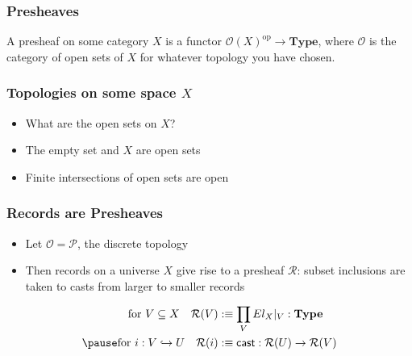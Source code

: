 \documentclass[tikz, 12pt]{beamer}
\begin{document}
\begin{frame}
  \frametitle{Presheaves}\pause

  A presheaf on some category $X$ is a functor
  $\mathcal{O}(X)^{\mathrm{op}}\to\mathbf{Type}$, where $\mathcal{O}$ is the
  category of open sets of $X$ for whatever topology you have chosen.
\end{frame}

\begin{frame}
  \frametitle{Topologies on some space $X$}\pause

  \begin{itemize}
    \item What are the open sets on $X$?\pause
    \item The empty set and $X$ are open sets
    \item Finite intersections of open sets are open
  \end{itemize}
\end{frame}

\begin{frame}
  \frametitle{Records are Presheaves}\pause

  \begin{itemize}
    \item Let $\mathcal{O} = \mathcal{P}$, the discrete topology\pause
    \item Then records on a universe $X$ give rise to a presheaf $\mathcal{R}$: subset inclusions are taken to casts from larger to smaller records
  \end{itemize}
  \pause

  \[
    \begin{aligned}
      \text{for } V\subseteq X\quad \mathcal{R}(V) &:\equiv \prod_V El_X|_V : \mathbf{Type}\\ \pause
      \text{for } i : V\hookrightarrow U\quad \mathcal{R}(i) &:\equiv \mathsf{cast} : \mathcal{R}(U)\to\mathcal{R}(V)
    \end{aligned}
  \]
\end{frame}
\end{document}
